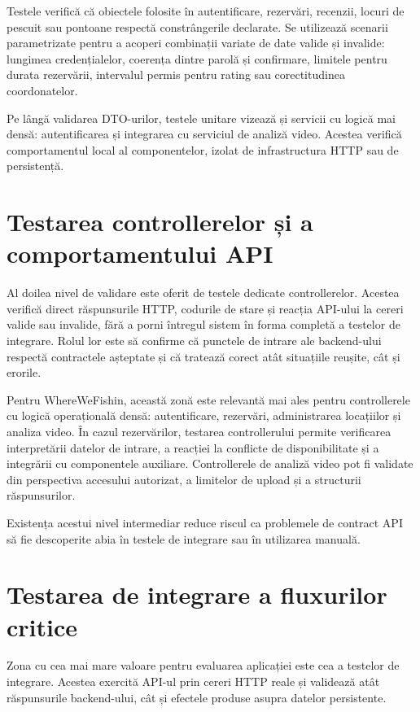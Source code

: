 Testele verifică că obiectele folosite în autentificare, rezervări, recenzii, locuri de pescuit sau pontoane respectă constrângerile declarate. Se utilizează scenarii parametrizate pentru a acoperi combinații variate de date valide și invalide: lungimea credențialelor, coerența dintre parolă și confirmare, limitele pentru durata rezervării, intervalul permis pentru rating sau corectitudinea coordonatelor.

Pe lângă validarea DTO-urilor, testele unitare vizează și servicii cu logică mai densă: autentificarea și integrarea cu serviciul de analiză video. Acestea verifică comportamentul local al componentelor, izolat de infrastructura HTTP sau de persistență.

\section{Testarea controllerelor și a comportamentului API}

Al doilea nivel de validare este oferit de testele dedicate controllerelor. Acestea verifică direct răspunsurile HTTP, codurile de stare și reacția API-ului la cereri valide sau invalide, fără a porni întregul sistem în forma completă a testelor de integrare. Rolul lor este să confirme că punctele de intrare ale backend-ului respectă contractele așteptate și că tratează corect atât situațiile reușite, cât și erorile.

Pentru WhereWeFishin, această zonă este relevantă mai ales pentru controllerele cu logică operațională densă: autentificare, rezervări, administrarea locațiilor și analiza video. În cazul rezervărilor, testarea controllerului permite verificarea interpretării datelor de intrare, a reacției la conflicte de disponibilitate și a integrării cu componentele auxiliare. Controllerele de analiză video pot fi validate din perspectiva accesului autorizat, a limitelor de upload și a structurii răspunsurilor.

Existența acestui nivel intermediar reduce riscul ca problemele de contract API să fie descoperite abia în testele de integrare sau în utilizarea manuală.

\section{Testarea de integrare a fluxurilor critice}

Zona cu cea mai mare valoare pentru evaluarea aplicației este cea a testelor de integrare. Acestea exercită API-ul prin cereri HTTP reale și validează atât răspunsurile backend-ului, cât și efectele produse asupra datelor persistente.

